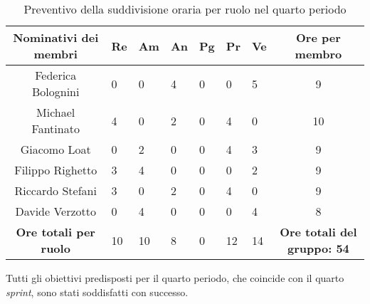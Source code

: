 \begin{table}[h!]
    \centering
    \renewcommand{\arraystretch}{1.5}
    \begin{tabularx}{\textwidth}{|c|X|X|X|X|X|X|c|}\hline
    \rowcolor[HTML]{FFD700} 
    \textbf{Nominativi dei membri} & \textbf{Re} & \textbf{Am} & \textbf{An} & \textbf{Pg} & \textbf{Pr} & \textbf{Ve} & \textbf{Ore per membro} \\ \hline
    Federica Bolognini  & 0 & 0 & 4 & 0 & 0 & 5 & 9 \\ \hline
    Michael Fantinato   & 4 & 0 & 2 & 0 & 4 & 0 & 10 \\ \hline
    Giacomo Loat        & 0 & 2 & 0 & 0 & 4 & 3 & 9 \\ \hline
    Filippo Righetto    & 3 & 4 & 0 & 0 & 0 & 2 & 9 \\ \hline
    Riccardo Stefani    & 3 & 0 & 2 & 0 & 4 & 0 & 9 \\ \hline
    Davide Verzotto     & 0 & 4 & 0 & 0 & 0 & 4 & 8 \\ \hline
    \rowcolor[HTML]{FFD700} 
    \textbf{Ore totali per ruolo} & 10 & 10 & 8 & 0 & 12 & 14 & \textbf{Ore totali del gruppo: 54} \\ \hline
    \end{tabularx}
    \caption{Preventivo della suddivisione oraria per ruolo nel quarto periodo}
\end{table}

Tutti gli obiettivi predisposti per il quarto periodo, che coincide con il quarto \emph{sprint}, sono stati soddisfatti con successo.

